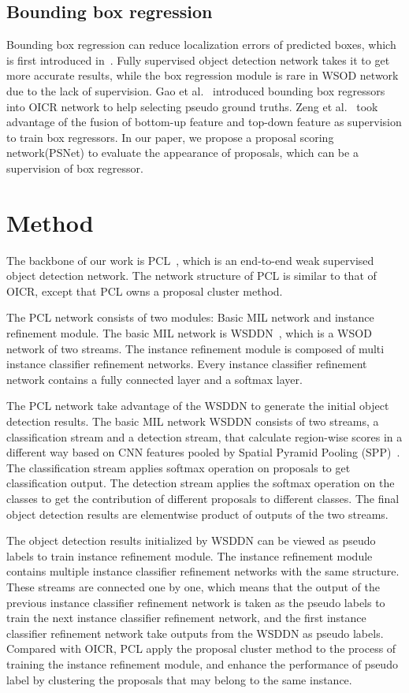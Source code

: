 \documentclass[final,3p,times,twocolumn]{elsarticle}
\begin{document}
\subsection{Bounding box regression}
Bounding box regression can reduce localization errors of predicted boxes, which is first introduced in~\cite{girshick2014rich}. Fully supervised object detection network takes it to get more accurate results, while the box regression module is rare in WSOD network due to the lack of supervision. Gao et al.~\cite{gao2018c} introduced bounding box regressors into OICR network to help selecting pseudo ground truths. Zeng et al.~\cite{zeng2019wsod2} took advantage of the fusion of bottom-up feature and top-down feature as supervision to train box regressors. In our paper, we propose a proposal scoring network(PSNet) to evaluate the appearance of proposals, which can be a supervision of box regressor.

\section{Method}
The backbone of our work is PCL~\cite{tang2018pcl}, which is an end-to-end weak supervised object detection network. The network structure of PCL is similar to that of OICR, except that PCL owns a proposal cluster method.

The PCL network consists of two modules: Basic MIL network and instance refinement module. The basic MIL network is WSDDN~\cite{bilen2016weakly}, which is a WSOD network of two streams. The instance refinement module is composed of multi instance classifier refinement networks. Every instance classifier refinement network contains a fully connected layer and a softmax layer.

The PCL network take advantage of the WSDDN to generate the initial object detection results. The basic MIL network WSDDN consists of two streams, a classification stream and a detection stream, that calculate region-wise scores in a different way based on CNN features pooled by Spatial Pyramid Pooling (SPP)~\cite{He2014Spatial}. The classification stream applies softmax operation on proposals to get classification output. The detection stream applies the softmax operation on the classes to get the contribution of different proposals to different classes. The final object detection results are elementwise product of outputs of the two streams.

The object detection results initialized by WSDDN can be viewed as pseudo labels to train instance refinement module. The instance refinement module contains multiple instance classifier refinement networks with the same structure. These streams are connected one by one, which means that the output of the previous instance classifier refinement network is taken as the pseudo labels to train the next instance classifier refinement network, and the first instance classifier refinement network take outputs from the WSDDN as pseudo labels. Compared with OICR, PCL apply the proposal cluster method to the process of training the instance refinement module, and enhance the performance of pseudo label by clustering the proposals that may belong to the same instance.
\end{document}
